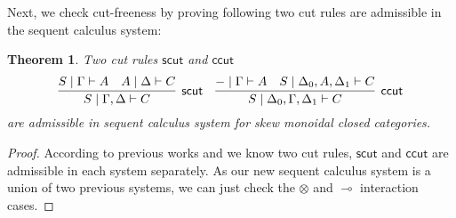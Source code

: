 \documentclass[submission,copyright,creativecommons]{eptcs}
\newtheorem{theorem}{Theorem}
\newcommand{\ot}{\otimes}
\newcommand{\lolli}{\multimap}
\begin{document}
Next, we check cut-freeness by proving following two cut rules are admissible in the sequent calculus system:
\begin{theorem}
Two cut rules $\mathsf{scut}$ and $\mathsf{ccut}$
  \begin{displaymath}
    \infer[\mathsf{scut}]{S \mid \Gamma , \Delta \vdash C}{
      S \mid \Gamma \vdash A
      &
      A \mid \Delta \vdash C
    }
    \quad
    \infer[\mathsf{ccut}]{S \mid \Delta_0 , \Gamma , \Delta_1 \vdash C}{
      - \mid \Gamma \vdash A
      &
      S \mid \Delta_0 , A , \Delta_1 \vdash C
    }
  \end{displaymath}
  are admissible in sequent calculus system for skew monoidal closed categories.
\end{theorem}
\begin{proof}
  According to previous works \cite{uustalu:sequent:2018} and \cite{uustalu:deductive:nodate} we know two cut rules, $\mathsf{scut}$ and $\mathsf{ccut}$ are admissible in each system separately.
  As our new sequent calculus system is a union of two previous systems, we can just check the $\ot$ and $\lolli$ interaction cases.


\end{proof}
\end{document}
